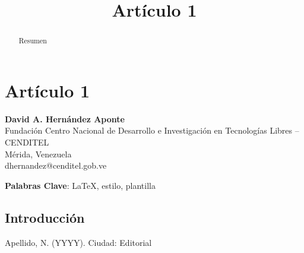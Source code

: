 %
\newpage
\title{Artículo 1}
\section{Artículo 1}

\begin{center}
\textbf{David A. Hernández Aponte} \\
Fundación Centro Nacional de Desarrollo e Investigación en Tecnologías Libres -- CENDITEL\\
Mérida, Venezuela\\
dhernandez@cenditel.gob.ve
\end{center}

\begin{abstract}
Resumen
\end{abstract}

\textbf{Palabras Clave}: \LaTeX, estilo, plantilla

\subsection{Introducción}


\begin{thebibliography}{9}

 Apellido, N. (YYYY).
\newblock Ciudad:
\newblock Editorial

\end{thebibliography}

%
